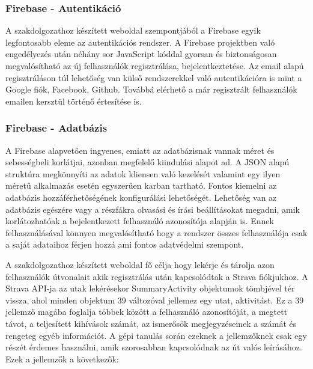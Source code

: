 \subsubsection{Firebase - Autentikáció}
A szakdolgozathoz készített weboldal szempontjából a Firebase egyik legfontosabb eleme az autentikációs rendszer. A Firebase projektben való engedélyezés után néhány sor JavaScript kóddal gyorsan és biztonságosan megvalósítható az új felhasználók regisztrálása, bejelentkeztetése. Az email alapú regisztráláson túl lehetőség van külső rendszerekkel való autentikációra is mint a Google fiók, Facebook, Github. Továbbá elérhető a már regisztrált felhasználók emailen kersztül történő értesítése is.

\subsubsection{Firebase - Adatbázis}
A Firebase alapvetően ingyenes, emiatt az adatbázisnak vannak méret és sebességbeli korlátjai, azonban megfelelő kiindulási alapot ad. A JSON alapú struktúra megkönnyíti az adatok kliensen való kezelését valamint egy ilyen méretű alkalmazás esetén egyszerűen karban tartható. Fontos kiemelni az adatbázis hozzáférhetőségének konfigurálási lehetőségét. Lehetőség van az adatbázis egészére vagy a részfákra olvasási és írási beállításokat megadni, amik korlátozhatóak a bejelentkezett felhasználó azonosítója alapján is. Ennek felhasználásával könnyen megvalósítható hogy a rendszer összes felhasználója csak a saját adataihoz férjen hozzá ami fontos adatvédelmi szempont.

 \label{ssec:adatstruktura}
A szakdolgozathoz készített weboldal fő célja hogy lekérje és tárolja azon felhasználók útvonalait akik regisztrálás után kapcsolódtak a Strava fiókjukhoz. A Strava API-ja az utak lekérésekor SummaryActivity objektumok tömbjével tér vissza, ahol minden objektum 39 változóval jellemez egy utat, aktivitást. Ez a 39 jellemző magába foglalja többek között a felhasználó azonosítóját, a megtett távot, a teljesített kihívások számát, az ismerősök megjegyzéseinek a számát és rengeteg egyéb információt. A gépi tanulás során ezeknek a jellemzőknek csak egy részét érdemes használni, amik szorosabban kapcsolódnak az út valós leírásához. Ezek a jellemzők a következők: 

